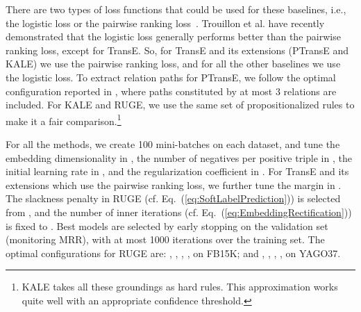 \documentclass[letterpaper]{article} \usepackage{aaai18}  \usepackage{times}  \usepackage{helvet}  \usepackage{courier}  \usepackage{url}  \usepackage{graphicx}  \usepackage{amsmath}
\begin{document}
There are two types of loss functions that could be used for these baselines, i.e., the logistic loss or the pairwise ranking loss~\cite{nickel2016:HolE}. Trouillon et al.  have recently demonstrated that the logistic loss generally performs better than the pairwise ranking loss, except for TransE. So, for TransE and its extensions (PTransE and KALE) we use the pairwise ranking loss, and for all the other baselines we use the logistic loss. To extract relation paths for PTransE, we follow the optimal configuration reported in \cite{lin2015:PTransE}, where paths constituted by at most 3 relations are included. For KALE and RUGE, we use the same set of propositionalized rules to make it a fair comparison.\footnote{KALE takes all these groundings as hard rules. This approximation works quite well with an appropriate confidence threshold.}

For all the methods, we create 100 mini-batches on each dataset, and tune the embedding dimensionality  in  , the number of negatives per positive triple  in , the initial learning rate  in  , and the  regularization coefficient  in  . For TransE and its extensions which use the pairwise ranking loss, we further tune the margin  in . The slackness penalty  in RUGE (cf. Eq.~(\ref{eq:SoftLabelPrediction})) is selected from , and the number of inner iterations (cf. Eq.~(\ref{eq:EmbeddingRectification})) is fixed to . Best models are selected by early stopping on the validation set (monitoring MRR), with at most 1000 iterations over the training set. The optimal configurations for RUGE are:  , , , ,  on FB15K; and , , , ,  on YAGO37.
\end{document}
